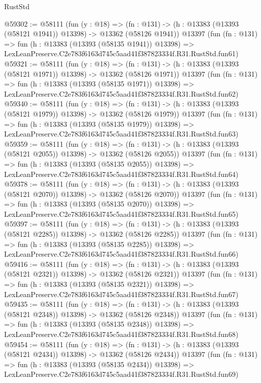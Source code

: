 \begin{lexlean}{RustStd}
\begin{coremodule}
@59302 := @58111
    (fun (y : @18) =>
    (fn : @131) -> (h : @13383 (@13393 (@58121 @1941)) @13398) -> @13362 (@58126 @1941))
    @13397
    (fun (fn : @131) =>
    fun (h : @13383 (@13393 (@58135 @1941)) @13398) =>
    LexLeanPreserve.C2e783f6163d745c5aad41f387823334f.R31.RustStd.fun61)
@59321 := @58111
    (fun (y : @18) =>
    (fn : @131) -> (h : @13383 (@13393 (@58121 @1971)) @13398) -> @13362 (@58126 @1971))
    @13397
    (fun (fn : @131) =>
    fun (h : @13383 (@13393 (@58135 @1971)) @13398) =>
    LexLeanPreserve.C2e783f6163d745c5aad41f387823334f.R31.RustStd.fun62)
@59340 := @58111
    (fun (y : @18) =>
    (fn : @131) -> (h : @13383 (@13393 (@58121 @1979)) @13398) -> @13362 (@58126 @1979))
    @13397
    (fun (fn : @131) =>
    fun (h : @13383 (@13393 (@58135 @1979)) @13398) =>
    LexLeanPreserve.C2e783f6163d745c5aad41f387823334f.R31.RustStd.fun63)
@59359 := @58111
    (fun (y : @18) =>
    (fn : @131) -> (h : @13383 (@13393 (@58121 @2055)) @13398) -> @13362 (@58126 @2055))
    @13397
    (fun (fn : @131) =>
    fun (h : @13383 (@13393 (@58135 @2055)) @13398) =>
    LexLeanPreserve.C2e783f6163d745c5aad41f387823334f.R31.RustStd.fun64)
@59378 := @58111
    (fun (y : @18) =>
    (fn : @131) -> (h : @13383 (@13393 (@58121 @2070)) @13398) -> @13362 (@58126 @2070))
    @13397
    (fun (fn : @131) =>
    fun (h : @13383 (@13393 (@58135 @2070)) @13398) =>
    LexLeanPreserve.C2e783f6163d745c5aad41f387823334f.R31.RustStd.fun65)
@59397 := @58111
    (fun (y : @18) =>
    (fn : @131) -> (h : @13383 (@13393 (@58121 @2285)) @13398) -> @13362 (@58126 @2285))
    @13397
    (fun (fn : @131) =>
    fun (h : @13383 (@13393 (@58135 @2285)) @13398) =>
    LexLeanPreserve.C2e783f6163d745c5aad41f387823334f.R31.RustStd.fun66)
@59416 := @58111
    (fun (y : @18) =>
    (fn : @131) -> (h : @13383 (@13393 (@58121 @2321)) @13398) -> @13362 (@58126 @2321))
    @13397
    (fun (fn : @131) =>
    fun (h : @13383 (@13393 (@58135 @2321)) @13398) =>
    LexLeanPreserve.C2e783f6163d745c5aad41f387823334f.R31.RustStd.fun67)
@59435 := @58111
    (fun (y : @18) =>
    (fn : @131) -> (h : @13383 (@13393 (@58121 @2348)) @13398) -> @13362 (@58126 @2348))
    @13397
    (fun (fn : @131) =>
    fun (h : @13383 (@13393 (@58135 @2348)) @13398) =>
    LexLeanPreserve.C2e783f6163d745c5aad41f387823334f.R31.RustStd.fun68)
@59454 := @58111
    (fun (y : @18) =>
    (fn : @131) -> (h : @13383 (@13393 (@58121 @2434)) @13398) -> @13362 (@58126 @2434))
    @13397
    (fun (fn : @131) =>
    fun (h : @13383 (@13393 (@58135 @2434)) @13398) =>
    LexLeanPreserve.C2e783f6163d745c5aad41f387823334f.R31.RustStd.fun69)

\end{coremodule}
\end{lexlean}
